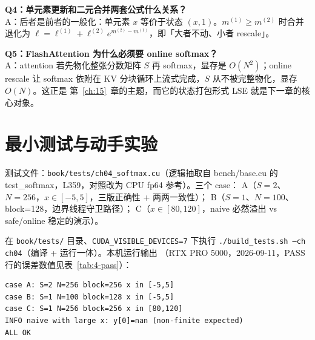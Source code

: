 \textbf{Q4：单元素更新和二元合并两套公式什么关系？}\\
A：后者是前者的一般化：单元素 $x$ 等价于状态 $(x, 1)$。$m^{(1)} \ge m^{(2)}$ 时合并退化为
$\ell = \ell^{(1)} + \ell^{(2)} e^{m^{(2)} - m^{(1)}}$，即「大者不动、小者 rescale」。

\textbf{Q5：FlashAttention 为什么必须要 online softmax？}\\
A：attention 若先物化整张分数矩阵 $S$ 再 softmax，显存是 $O(N^{2})$；online rescale 让
softmax 依附在 KV 分块循环上流式完成，$S$ 从不被完整物化，显存 $O(N)$。这正是
第~\ref{ch:15}~章的主题，而它的状态打包形式 LSE 就是下一章的核心对象。

\section{最小测试与动手实验}

测试文件：\texttt{book/\allowbreak{}tests/\allowbreak{}ch04\_\allowbreak{}softmax.\allowbreak{}cu}（逻辑抽取自 bench/base.cu 的
test\_softmax，L359，对照改为 CPU fp64 参考）。三个 case：
A（$S=2$、$N=256$，$x \in [-5,5]$，三版正确性 + 两两一致性）；
B（$S=1$、$N=100$、block=128，边界线程守卫路径）；
C（$x \in [80,120]$，naive 必然溢出 vs safe/online 稳定的演示）。

在 \texttt{book/tests/} 目录、\texttt{CUDA\_\allowbreak{}VISIBLE\_\allowbreak{}DEVICES=\allowbreak{}7} 下执行
\texttt{.\allowbreak{}/\allowbreak{}build\_\allowbreak{}tests.\allowbreak{}sh --ch ch04}（编译 + 运行一体）。本机运行输出
（RTX PRO 5000，2026-09-11，PASS 行的误差数值见表~\ref{tab:4-pass}）：

\begin{lstlisting}[style=console]
case A: S=2 N=256 block=256 x in [-5,5]
case B: S=1 N=100 block=128 x in [-5,5]
case C: S=1 N=256 block=256 x in [80,120]
INFO naive with large x: y[0]=nan (non-finite expected)
ALL OK
\end{lstlisting}

